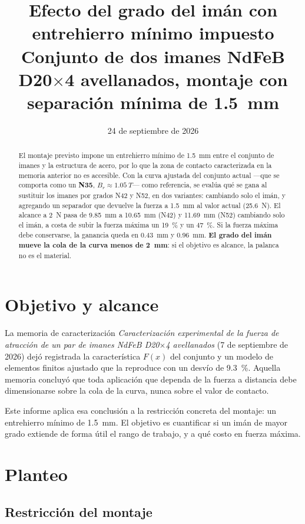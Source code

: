 \documentclass[11pt,a4paper]{article}
\title{\textbf{Efecto del grado del imán con entrehierro mínimo impuesto}\\[2pt]
\large\textbf{Conjunto de dos imanes NdFeB D20$\times$4 avellanados, montaje con
separación mínima de \SI{1,5}{mm}}}
\author{}
\date{24 de septiembre de 2026}
\begin{document}
\maketitle

\begin{abstract}
El montaje previsto impone un entrehierro mínimo de \SI{1,5}{mm} entre el conjunto de imanes
y la estructura de acero, por lo que la zona de contacto caracterizada en la memoria anterior
no es accesible. Con la curva ajustada del conjunto actual ---que se comporta como un
\textbf{N35}, $B_r \approx \SI{1,05}{T}$--- como referencia, se evalúa qué se gana al
sustituir los imanes por grados N42 y N52, en dos variantes: cambiando solo el imán, y
agregando un separador que devuelve la fuerza a \SI{1,5}{mm} al valor actual
(\SI{25,6}{N}). El alcance a \SI{2}{N} pasa de \SI{9,85}{mm} a \SI{10,65}{mm} (N42) y
\SI{11,69}{mm} (N52) cambiando solo el imán, a costa de subir la fuerza máxima un
\SI{19}{\percent} y un \SI{47}{\percent}. Si la fuerza máxima debe conservarse, la ganancia
queda en \SI{0,43}{mm} y \SI{0,96}{mm}. \textbf{El grado del imán mueve la cola de la curva
menos de \SI{2}{mm}}: si el objetivo es alcance, la palanca no es el material.
\end{abstract}

\section{Objetivo y alcance}

La memoria de caracterización \emph{Caracterización experimental de la fuerza de atracción de
un par de imanes NdFeB D20$\times$4 avellanados} (7 de septiembre de 2026) dejó registrada la
característica $F(x)$ del conjunto y un modelo de elementos finitos ajustado que la reproduce
con un desvío de \SI{9,3}{\percent}. Aquella memoria concluyó que toda aplicación que dependa
de la fuerza a distancia debe dimensionarse sobre la cola de la curva, nunca sobre el valor de
contacto.

Este informe aplica esa conclusión a la restricción concreta del montaje: un entrehierro
mínimo de \SI{1,5}{mm}. El objetivo es cuantificar si un imán de mayor grado extiende de
forma útil el rango de trabajo, y a qué costo en fuerza máxima.

\section{Planteo}

\subsection{Restricción del montaje}
\end{document}
